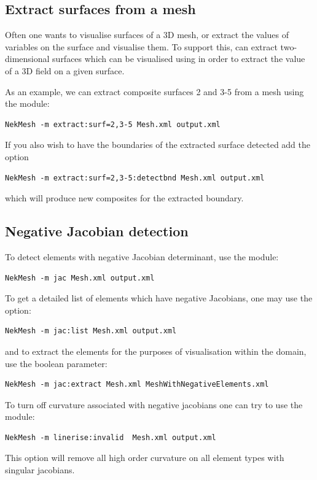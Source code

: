\subsection{Extract surfaces from a mesh}
\label{s:utilities:nekmesh:extract}

Often one wants to visualise surfaces of a 3D mesh, or extract the values of
variables on the surface and visualise them. To support this, \nm can extract
two-dimensional surfaces which can be visualised using  in
order to extract the value of a 3D field on a given surface.

As an example, we can extract composite surfaces 2 and 3-5 from a mesh using the
 module:
%
\begin{lstlisting}[style=BashInputStyle]
NekMesh -m extract:surf=2,3-5 Mesh.xml output.xml
\end{lstlisting}
%
If you also wish to have the boundaries of the extracted surface detected add
the  option
%
\begin{lstlisting}[style=BashInputStyle]
NekMesh -m extract:surf=2,3-5:detectbnd Mesh.xml output.xml
\end{lstlisting}
which will produce new composites for the extracted boundary.

\subsection{Negative Jacobian detection}

To detect elements with negative Jacobian determinant, use the 
module:
%
\begin{lstlisting}[style=BashInputStyle]
NekMesh -m jac Mesh.xml output.xml
\end{lstlisting}
%
To get a detailed list of elements which have negative Jacobians, one may use
the  option:
%
\begin{lstlisting}[style=BashInputStyle]
NekMesh -m jac:list Mesh.xml output.xml
\end{lstlisting}
%
and to extract the elements for the purposes of visualisation within the domain,
use the  boolean parameter:
%
\begin{lstlisting}[style=BashInputStyle]
NekMesh -m jac:extract Mesh.xml MeshWithNegativeElements.xml
\end{lstlisting}

To turn off curvature associated with negative jacobians one can try to use the
 module:
\begin{lstlisting}[style=BashInputStyle]
NekMesh -m linerise:invalid  Mesh.xml output.xml
\end{lstlisting}
This option will remove all high order curvature on all element types
with singular jacobians.


